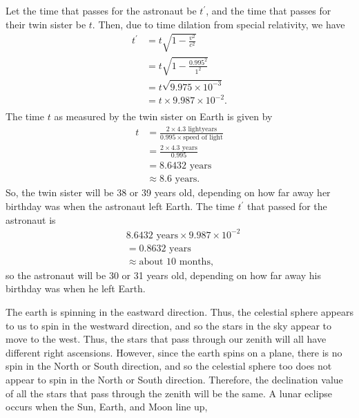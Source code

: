 \documentclass{templates/homework}
\begin{document}
\exercisepart
Let the time that passes for the astronaut be $t^\prime$, and the
time that passes for their twin sister be $t$. Then, due to time dilation from special
relativity, we have
\begin{align*}
    t^\prime &= t\sqrt{1 - \frac{v^2}{c^2}} \\
    &= t\sqrt{1 - \frac{0.995^2}{1^2}} \\
    &= t\sqrt{9.975 \times 10^{-3}} \\
    &= t \times 9.987 \times 10^{-2}. \\
\end{align*}
The time $t$ as measured by the twin sister on Earth is
given by
\begin{align*}
    t &= \frac{2 \times 4.3 \text{ lightyears}}{0.995 \times \text{speed of light}} \\
    &= \frac{2 \times 4.3 \text{ years}}{0.995} \\
    &= 8.6432 \text{ years} \\
    &\approx \text{8.6 years}.
\end{align*}
So, the twin sister will be 38 or 39 years old, depending on how far
away her birthday was when the astronaut left Earth. The time $t^\prime$ that passed
for the astronaut is 
\begin{align*}
    &8.6432 \text{ years} \times 9.987 \times 10^{-2} \\
    &= 0.8632 \text{ years} \\
    &\approx \text{about 10 months},
\end{align*}
so the astronaut will be 30 or 31 years old, depending on how far away his birthday was
when he left Earth.
\exercise
\exercisepart
\begin{figure}
\end{figure}
The earth is spinning in the eastward direction. Thus, the
celestial sphere appears to us to spin in the westward direction, and so the stars
in the sky appear to move to the west. Thus, the stars that pass through our zenith
will all have different right ascensions. However, since the earth spins on a plane, there
is no spin in the North or South direction, and so the celestial sphere too does not appear to spin
in the North or South direction. Therefore, the declination value of all the stars that pass
through the zenith will be the same.
\exercisepart
A lunar eclipse occurs when the Sun, Earth, and Moon line up,
\end{document}
